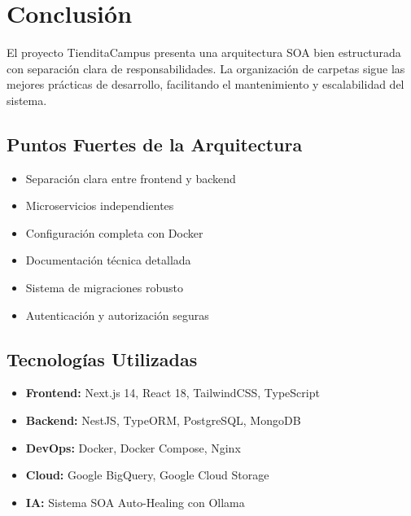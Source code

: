 \documentclass[12pt,a4paper]{article}
\begin{document}
\section{Conclusión}

El proyecto TienditaCampus presenta una arquitectura SOA bien estructurada con separación clara de responsabilidades. La organización de carpetas sigue las mejores prácticas de desarrollo, facilitando el mantenimiento y escalabilidad del sistema.

\subsection{Puntos Fuertes de la Arquitectura}
\begin{itemize}
\item Separación clara entre frontend y backend
\item Microservicios independientes
\item Configuración completa con Docker
\item Documentación técnica detallada
\item Sistema de migraciones robusto
\item Autenticación y autorización seguras
\end{itemize}

\subsection{Tecnologías Utilizadas}
\begin{itemize}
\item \textbf{Frontend:} Next.js 14, React 18, TailwindCSS, TypeScript
\item \textbf{Backend:} NestJS, TypeORM, PostgreSQL, MongoDB
\item \textbf{DevOps:} Docker, Docker Compose, Nginx
\item \textbf{Cloud:} Google BigQuery, Google Cloud Storage
\item \textbf{IA:} Sistema SOA Auto-Healing con Ollama
\end{itemize}
\end{document}

